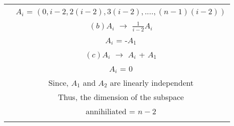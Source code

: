 \begin{table}[ht!]
\begin{center}
\begin{tabular}{|c|c|}
& $A_i$ = $(0,i-2,2(i-2),3(i-2),....,(n-1)(i-2))$ \\
& $(b)A_i$ $\longrightarrow$ $\frac{1}{i-2}A_i$ \\
& $A_i$ = -$A_1$ \\
& $(c)A_i$ $\longrightarrow$ $A_i$ + $A_1$ \\
& $A_i$ = $0$ \\
& Since, $A_1$ and $A_2$ are linearly independent\\
& Thus, the dimension of the subspace\\
& annihiliated = $n-2$ \\
& \\
\hline
\end{tabular}
\end{center}
\caption{}
\label{eq:solutions/3/5/10/table:2}
\end{table}
